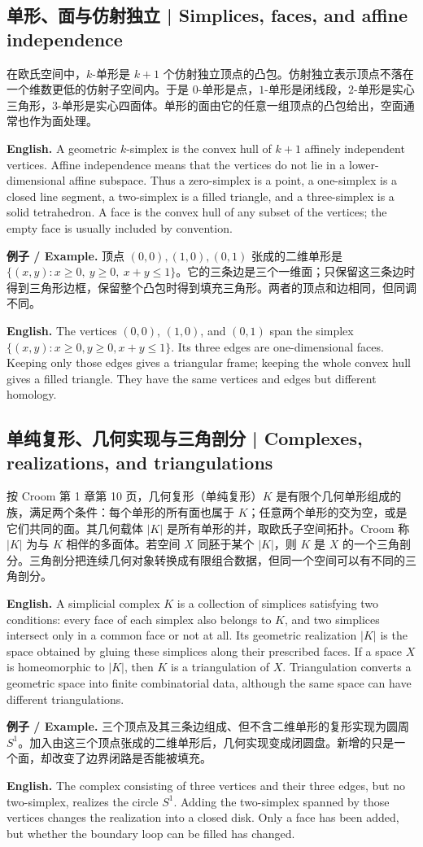 \documentclass[UTF8,11pt,a4paper]{ctexart}
\newcommand{\EN}[1]{\par\noindent\textbf{English.} #1\par}
\newcommand{\EX}[2]{\par\noindent\textbf{例子 / Example.} #1\par\EN{#2}}
\begin{document}
\subsection{单形、面与仿射独立 | Simplices, faces, and affine independence}
\noindent 在欧氏空间中，$k$-单形是 $k+1$ 个仿射独立顶点的凸包。仿射独立表示顶点不落在一个维数更低的仿射子空间内。于是 $0$-单形是点，$1$-单形是闭线段，$2$-单形是实心三角形，$3$-单形是实心四面体。单形的面由它的任意一组顶点的凸包给出，空面通常也作为面处理。
\EN{A geometric $k$-simplex is the convex hull of $k+1$ affinely independent vertices. Affine independence means that the vertices do not lie in a lower-dimensional affine subspace. Thus a zero-simplex is a point, a one-simplex is a closed line segment, a two-simplex is a filled triangle, and a three-simplex is a solid tetrahedron. A face is the convex hull of any subset of the vertices; the empty face is usually included by convention.}
\EX{顶点 $(0,0),(1,0),(0,1)$ 张成的二维单形是 $\{(x,y):x\ge0,\ y\ge0,\ x+y\le1\}$。它的三条边是三个一维面；只保留这三条边时得到三角形边框，保留整个凸包时得到填充三角形。两者的顶点和边相同，但同调不同。}{The vertices $(0,0)$, $(1,0)$, and $(0,1)$ span the simplex $\{(x,y):x\ge0, y\ge0, x+y\le1\}$. Its three edges are one-dimensional faces. Keeping only those edges gives a triangular frame; keeping the whole convex hull gives a filled triangle. They have the same vertices and edges but different homology.}

\subsection{单纯复形、几何实现与三角剖分 | Complexes, realizations, and triangulations}
\noindent 按 Croom 第 1 章第 10 页，几何复形（单纯复形）$K$ 是有限个几何单形组成的族，满足两个条件：每个单形的所有面也属于 $K$；任意两个单形的交为空，或是它们共同的面。其几何载体 $|K|$ 是所有单形的并，取欧氏子空间拓扑。Croom 称 $|K|$ 为与 $K$ 相伴的多面体。若空间 $X$ 同胚于某个 $|K|$，则 $K$ 是 $X$ 的一个三角剖分。三角剖分把连续几何对象转换成有限组合数据，但同一个空间可以有不同的三角剖分。
\EN{A simplicial complex $K$ is a collection of simplices satisfying two conditions: every face of each simplex also belongs to $K$, and two simplices intersect only in a common face or not at all. Its geometric realization $|K|$ is the space obtained by gluing these simplices along their prescribed faces. If a space $X$ is homeomorphic to $|K|$, then $K$ is a triangulation of $X$. Triangulation converts a geometric space into finite combinatorial data, although the same space can have different triangulations.}
\EX{三个顶点及其三条边组成、但不含二维单形的复形实现为圆周 $S^1$。加入由这三个顶点张成的二维单形后，几何实现变成闭圆盘。新增的只是一个面，却改变了边界闭路是否能被填充。}{The complex consisting of three vertices and their three edges, but no two-simplex, realizes the circle $S^1$. Adding the two-simplex spanned by those vertices changes the realization into a closed disk. Only a face has been added, but whether the boundary loop can be filled has changed.}
\end{document}
